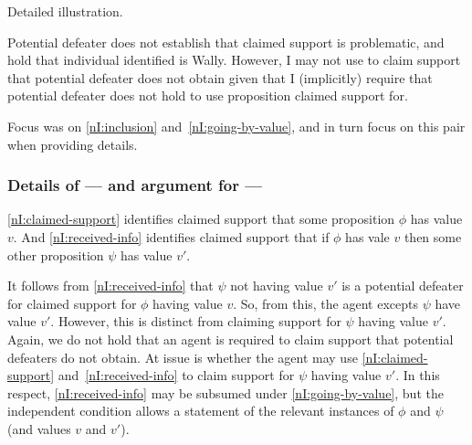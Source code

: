 \begin{note}
  Detailed illustration.

  Potential defeater does not establish that claimed support is problematic, and hold that individual identified is Wally.
  However, I may not use to claim support that potential defeater does not obtain given that I (implicitly) require that potential defeater does not hold to use proposition claimed support for.

  Focus was on \ref{nI:inclusion} and~\ref{nI:going-by-value}, and in turn focus on this pair when providing details.
\end{note}

\subsubsection{Details of --- and argument for --- \nI{}}
\label{sec:details-ni}

\begin{note}
  \ref{nI:claimed-support} identifies claimed support that some proposition \(\phi\) has value \(v\).
  And \ref{nI:received-info} identifies claimed support that if \(\phi\) has vale \(v\) then some other proposition \(\psi\) has value \(v'\).

  It follows from \ref{nI:received-info} that \(\psi\) not having value \(v'\) is a potential defeater for claimed support for \(\phi\) having value \(v\).
  So, from this, the agent excepts \(\psi\) have value \(v'\).
  However, this is distinct from claiming support for \(\psi\) having value \(v'\).
  Again, we do not hold that an agent is required to claim support that potential defeaters do not obtain.
  At issue is whether the agent may use \ref{nI:claimed-support} and~\ref{nI:received-info} to claim support for \(\psi\) having value \(v'\).
  In this respect, \ref{nI:received-info} may be subsumed under \ref{nI:going-by-value}, but the independent condition allows a statement of the relevant instances of \(\phi\) and \(\psi\) (and values \(v\) and \(v'\)).

\end{note}

